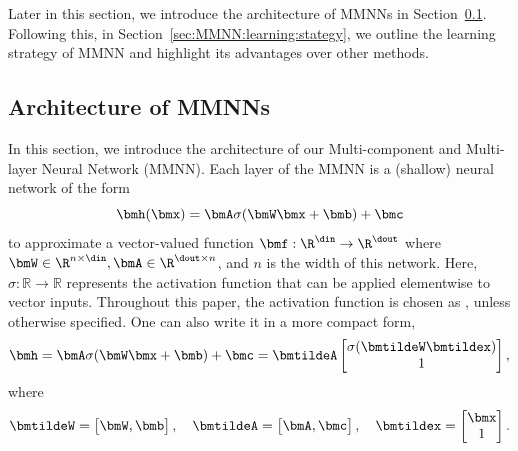 \documentclass[review,hidelinks,onefignum,onetabnum]{siamart250211}
\begin{document}
Later in this section, we introduce the architecture of MMNNs in Section~\ref{sec:MMNN:architecture}. Following this, in Section~\ref{sec:MMNN:learning:stategy}, we outline the learning strategy of MMNN and highlight its advantages over other methods. 


\subsection{Architecture of MMNNs}
\label{sec:MMNN:architecture}

In this section, we introduce the architecture of our Multi-component and Multi-layer Neural Network (MMNN). Each layer of the MMNN is a (shallow) neural network of the form
\begin{equation*}
    \bmh(\bmx)=\bmA \sigma(\bmW\bmx +\bmb)+\bmc
\end{equation*}
to approximate a vector-valued function 
$\bmf:\R^\din\to\R^\dout$
where $\bmW \in \R^{n\times \din}, \bmA\in \R^{\dout\times n}$, and $n$ is the width of this network.
Here, \(\sigma:\mathbb{R}\to\mathbb{R}\) represents the activation function that can be applied elementwise to vector inputs. Throughout this paper, the activation function is chosen as \ReLU, unless otherwise specified.
One can also write it in a more compact form, 
\begin{equation}\label{eq:shallow}
    \bmh=\bmA \sigma(\bmW\bmx +\bmb)+\bmc
    =\bmtildeA\left[\begin{matrix}
        \sigma(\bmtildeW\bmtildex) \\
         1
    \end{matrix}\right],
\end{equation}
where 
\begin{equation*}
    \bmtildeW=\left[\begin{matrix}
        \bmW, \bmb
    \end{matrix}\right],\quad 
    \bmtildeA=\left[\begin{matrix}
        \bmA, \bmc
    \end{matrix}\right],\quad
    \bmtildex=\left[\begin{matrix}
        \bmx\\  1
    \end{matrix}\right]
    .
\end{equation*}
\end{document}
